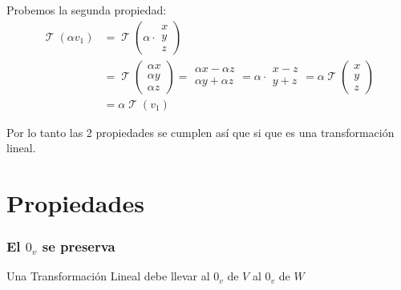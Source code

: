 \documentclass[12pt]{report}                                    %
\DeclareMathOperator \LinealTransformation {\mathcal{T}}
\begin{document}
            Probemos la segunda propiedad:
            \begin{equation*}
            \begin{split}
                \LinealTransformation (\alpha v_1) & =
                \LinealTransformation \left( \alpha \cdot \begin{matrix} x\\y\\z \end{matrix} \right) \\
                & = \LinealTransformation \left( \begin{matrix} \alpha x\\ \alpha y\\ \alpha z\end{matrix} \right) =
                \begin{matrix} \alpha x - \alpha z\\ \alpha y + \alpha z\end{matrix}  =
                \alpha \cdot \begin{matrix}x-z\\y+z\end{matrix} =
                \alpha \LinealTransformation \left( \begin{matrix}x\\y\\z\end{matrix} \right) \\
                & = \alpha \LinealTransformation(v_1)
            \end{split}
            \end{equation*}

        Por lo tanto las 2 propiedades se cumplen así que si que es una transformación lineal.


    \clearpage
    \section{Propiedades}

        \subsubsection{El $0_v$ se preserva}
            Una Transformación Lineal debe llevar al $0_v$ de $V$ al $0_v$ de $W$
\end{document}
